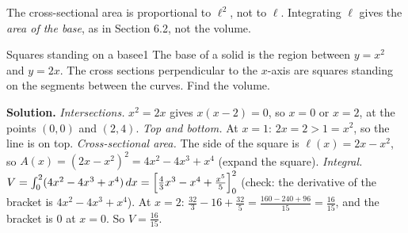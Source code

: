 \documentclass[11pt]{article}
\begin{document}
\begin{warn}
The cross-sectional area is proportional to $\ell^2$, not to $\ell$. Integrating $\ell$ gives the \emph{area of the base}, as in Section 6.2, not the volume.
\end{warn}

\begin{exmp}{Squares standing on a base}{e1}
The base of a solid is the region between $y=x^2$ and $y=2x$. The cross sections perpendicular to the $x$-axis are squares standing on the segments between the curves. Find the volume.

\textbf{Solution.} \emph{Intersections.} $x^2=2x$ gives $x(x-2)=0$, so $x=0$ or $x=2$, at the points $(0,0)$ and $(2,4)$. \emph{Top and bottom.} At $x=1$: $2x=2>1=x^2$, so the line is on top.
\emph{Cross-sectional area.} The side of the square is $\ell(x)=2x-x^2$, so $A(x)=(2x-x^2)^2=4x^2-4x^3+x^4$ (expand the square).
\emph{Integral.} $V=\int_0^2(4x^2-4x^3+x^4)\,dx=\Bigl[\frac43x^3-x^4+\frac{x^5}5\Bigr]_0^2$ (check: the derivative of the bracket is $4x^2-4x^3+x^4$). At $x=2$: $\frac{32}3-16+\frac{32}5=\frac{160-240+96}{15}=\frac{16}{15}$, and the bracket is $0$ at $x=0$. So $V=\frac{16}{15}$.


\end{exmp}
\end{document}
